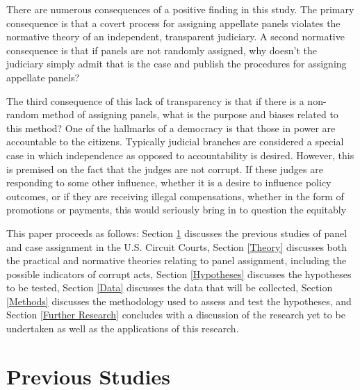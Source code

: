 \documentclass[12pt]{article}
\begin{document}
There are numerous consequences of a positive finding in this study.  The primary consequence is that a covert process for assigning appellate panels violates the normative theory of an independent, transparent judiciary.  A second normative consequence is that if panels are not randomly assigned, why doesn't the judiciary simply admit that is the case and publish the procedures for assigning appellate panels?  

The third consequence of this lack of transparency is that if there is a non-random method of assigning panels, what is the purpose and biases related to this method?  One of the hallmarks of a democracy is that those in power are accountable to the citizens.  Typically judicial branches are considered a special case in which independence as opposed to accountability is desired.  However, this is premised on the fact that the judges are not corrupt.  If these judges are responding to some other influence, whether it is a desire to influence policy outcomes, or if they are receiving illegal compensations, whether in the form of promotions or payments, this would seriously bring in to question the equitably 

This paper proceeds as follows: Section \ref{Previous} discusses the previous studies of panel and case assignment in the U.S. Circuit Courts, Section \ref{Theory} discusses both the practical and normative theories relating to panel assignment, including the possible indicators of corrupt acts, Section \ref{Hypotheses} discusses the hypotheses to be tested, Section \ref{Data} discusses the data that will be collected, Section \ref{Methods} discusses the methodology used to assess and test the hypotheses, and Section \ref{Further Research} concludes with a discussion of the research yet to be undertaken as well as the applications of this research.

\section{Previous Studies}\label{Previous}
\end{document}
